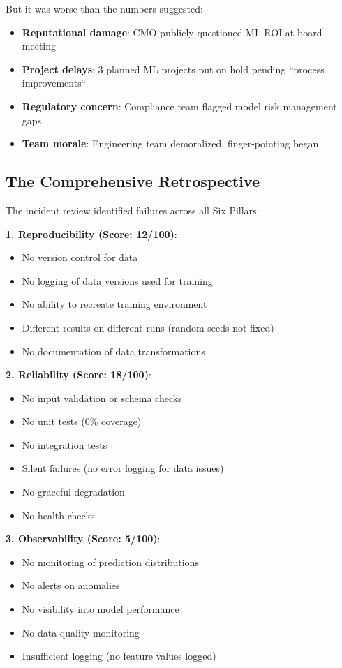 But it was worse than the numbers suggested:
\begin{itemize}
    \item \textbf{Reputational damage}: CMO publicly questioned ML ROI at board meeting
    \item \textbf{Project delays}: 3 planned ML projects put on hold pending ``process improvements``
    \item \textbf{Regulatory concern}: Compliance team flagged model risk management gaps
    \item \textbf{Team morale}: Engineering team demoralized, finger-pointing began
\end{itemize}

\subsection{The Comprehensive Retrospective}

The incident review identified failures across all Six Pillars:

\textbf{1. Reproducibility (Score: 12/100)}:
\begin{itemize}
    \item [-] No version control for data
    \item [-] No logging of data versions used for training
    \item [-] No ability to recreate training environment
    \item [-] Different results on different runs (random seeds not fixed)
    \item [-] No documentation of data transformations
\end{itemize}

\textbf{2. Reliability (Score: 18/100)}:
\begin{itemize}
    \item [-] No input validation or schema checks
    \item [-] No unit tests (0\% coverage)
    \item [-] No integration tests
    \item [-] Silent failures (no error logging for data issues)
    \item [-] No graceful degradation
    \item [-] No health checks
\end{itemize}

\textbf{3. Observability (Score: 5/100)}:
\begin{itemize}
    \item [-] No monitoring of prediction distributions
    \item [-] No alerts on anomalies
    \item [-] No visibility into model performance
    \item [-] No data quality monitoring
    \item [-] Insufficient logging (no feature values logged)
\end{itemize}


